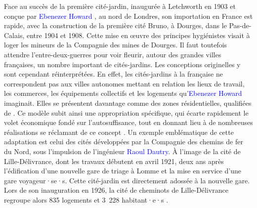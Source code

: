 \begin{refsegment}
Face au succès de la première cité-jardin, inaugurée à Letchworth en 1903 et conçue par \textcolor{blue}{Ebenezer Howard} \textcolor{blue}{\autocite[9]{gaboriau_aux_2004}}, au nord de Londres, son importation en France est rapide, avec la construction de la première cité Bruno, à Dourges, dans le Pas-de-Calais, entre 1904 et 1908. Cette mise en œuvre des principes hygiénistes visait à loger les mineurs de la Compagnie des mines de Dourges. Il faut toutefois attendre l’entre-deux-guerres pour voir fleurir, autour des grandes villes françaises, un nombre important de cités-jardins. Les conceptions originelles y sont cependant réinterprétées. En effet, les cités-jardins à la française ne correspondent pas aux villes autonomes mettant en relation les lieux de travail, les commerces, les équipements collectifs et les logements qu’\textcolor{blue}{Ebenezer Howard} imaginait. Elles se présentent davantage comme des zones résidentielles, qualifiées de . Ce modèle subit ainsi une appropriation spécifique, qui écarte rapidement le volet économique fondé sur l’autosuffisance, tout en donnant lieu à de nombreuses réalisations se réclamant de ce concept \textcolor{blue}{\autocite[238]{guelton_cite-jardin_2013}}. Un exemple emblématique de cette adaptation est celui des cités développées par la Compagnie des chemins de fer du Nord, sous l’impulsion de l’ingénieur \textcolor{blue}{Raoul Dautry}. À l'image de la cité de Lille-Délivrance, dont les travaux débutent en avril 1921, deux ans après l'édification d'une nouvelle gare de triage à Lomme et la mise en service d'une gare voyageur·se·s. Cette cité-jardin est directement adossée à la nouvelle gare. Lors de son inauguration en 1926, la cité de cheminots de Lille-Délivrance regroupe alors 835 logements et 3~228 habitant·e·s \textcolor{blue}{\autocite[19]{gaboriau_aux_2004}}.%


\end{refsegment}
